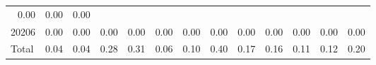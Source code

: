\begin{table}[!h]
\begin{tabular}{lllllllllllll}
  \multicolumn{1}{r}{0.00} &
  \multicolumn{1}{r}{0.00} &
  \multicolumn{1}{r}{0.00} \\
\multicolumn{1}{l}{\hspace{1em}20206} &
  \multicolumn{1}{|r}{0.00} &
  \multicolumn{1}{r}{0.00} &
  \multicolumn{1}{r}{0.00} &
  \multicolumn{1}{r}{0.00} &
  \multicolumn{1}{r}{0.00} &
  \multicolumn{1}{r}{0.00} &
  \multicolumn{1}{r}{0.00} &
  \multicolumn{1}{r}{0.00} &
  \multicolumn{1}{r}{0.00} &
  \multicolumn{1}{r}{0.00} &
  \multicolumn{1}{r}{0.00} &
  \multicolumn{1}{r}{0.00} \\
\multicolumn{1}{l}{\hspace{1em}Total} &
  \multicolumn{1}{|r}{0.04} &
  \multicolumn{1}{r}{0.04} &
  \multicolumn{1}{r}{0.28} &
  \multicolumn{1}{r}{0.31} &
  \multicolumn{1}{r}{0.06} &
  \multicolumn{1}{r}{0.10} &
  \multicolumn{1}{r}{0.40} &
  \multicolumn{1}{r}{0.17} &
  \multicolumn{1}{r}{0.16} &
  \multicolumn{1}{r}{0.11} &
  \multicolumn{1}{r}{0.12} &
  \multicolumn{1}{r}{0.20} \\
\cline{1-13}
\end{tabular}
\end{table}
